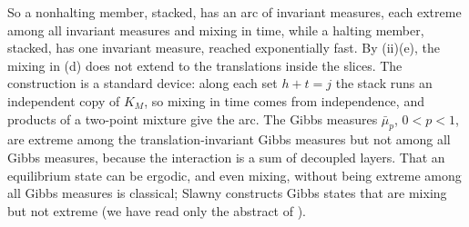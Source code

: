 So a nonhalting member, stacked, has an arc of invariant measures, each extreme among all invariant measures and mixing in time, while a halting member, stacked, has one invariant measure, reached exponentially fast. By (ii)(e), the mixing in (d) does not extend to the translations inside the slices. The construction is a standard device: along each set $h+t=j$ the stack runs an independent copy of $K_M$, so mixing in time comes from independence, and products of a two-point mixture give the arc. The Gibbs measures $\bar\mu_p$, $0<p<1$, are extreme among the translation-invariant Gibbs measures but not among all Gibbs measures, because the interaction is a sum of decoupled layers. That an equilibrium state can be ergodic, and even mixing, without being extreme among all Gibbs measures is classical; Slawny \cite{Sla81} constructs Gibbs states that are mixing but not extreme (we have read only the abstract of \cite{Sla81}).



